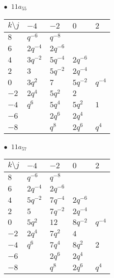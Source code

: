 \begin{minipage}{\linewidth}
$\bullet\ $ $11a_{55}$ \vspace{0.5em} \\
\begin{tabular}{l|llll}
$k \setminus j$ & $-4$ & $-2$ & $0$ & $2$ \\
\hline
$8$ & $q^{-6}$ & $q^{-8}$ &  &  \\
$6$ & $2q^{-4}$ & $2q^{-6}$ &  &  \\
$4$ & $3q^{-2}$ & $5q^{-4}$ & $2q^{-6}$ &  \\
$2$ & $3$ & $5q^{-2}$ & $2q^{-4}$ &  \\
$0$ & $3q^{2}$ & $7$ & $5q^{-2}$ & $q^{-4}$ \\
$-2$ & $2q^{4}$ & $5q^{2}$ & $2$ &  \\
$-4$ & $q^{6}$ & $5q^{4}$ & $5q^{2}$ & $1$ \\
$-6$ &  & $2q^{6}$ & $2q^{4}$ &  \\
$-8$ &  & $q^{8}$ & $2q^{6}$ & $q^{4}$ \\
\end{tabular}
\vspace{2em}
\end{minipage}
%
\begin{minipage}{\linewidth}
$\bullet\ $ $11a_{57}$ \vspace{0.5em} \\
\begin{tabular}{l|llll}
$k \setminus j$ & $-4$ & $-2$ & $0$ & $2$ \\
\hline
$8$ & $q^{-6}$ & $q^{-8}$ &  &  \\
$6$ & $2q^{-4}$ & $2q^{-6}$ &  &  \\
$4$ & $5q^{-2}$ & $7q^{-4}$ & $2q^{-6}$ &  \\
$2$ & $5$ & $7q^{-2}$ & $2q^{-4}$ &  \\
$0$ & $5q^{2}$ & $12$ & $8q^{-2}$ & $q^{-4}$ \\
$-2$ & $2q^{4}$ & $7q^{2}$ & $4$ &  \\
$-4$ & $q^{6}$ & $7q^{4}$ & $8q^{2}$ & $2$ \\
$-6$ &  & $2q^{6}$ & $2q^{4}$ &  \\
$-8$ &  & $q^{8}$ & $2q^{6}$ & $q^{4}$ \\
\end{tabular}
\vspace{2em}
\end{minipage}
%
